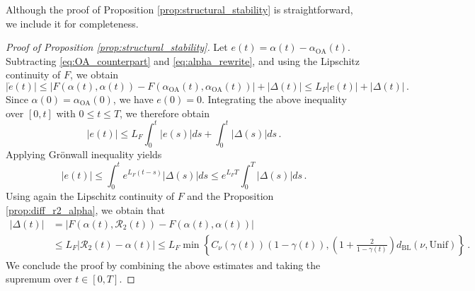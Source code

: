 \documentclass[10pt]{article}
\theoremstyle{definition}
\theoremstyle{definition}
\newtheorem{remark}[theorem]{Remark}
\numberwithin{equation}{section}
\newcommand{\CR}{\mathcal{R}}
\newcommand{\BL}{\mathrm{BL}}
\newcommand{\Unif}{\mathrm{Unif}}
\newcommand{\OA}{\mathrm{OA}}
\begin{document}
Although the proof of Proposition \ref{prop:structural_stability} is straightforward, we include it for completeness.

\begin{proof}[Proof of Proposition \ref{prop:structural_stability}]
Let $e(t) = \alpha(t) - \alpha_{\OA}(t)$.
Subtracting \eqref{eq:OA_counterpart} and \eqref{eq:alpha_rewrite}, and using the Lipschitz continuity of $F$, we obtain
\begin{equation*}
|\dot{e}(t)| \leq \left| F(\alpha(t), \alpha(t)) - F(\alpha_{\OA}(t), \alpha_{\OA}(t)) \right| + |\Delta(t)| \leq L_F|e(t)| + |\Delta(t)| \, .
\end{equation*}
Since $\alpha(0) = \alpha_{\OA}(0)$, we have $e(0) = 0$.
Integrating the above inequality over $[0,t]$ with $0 \leq t \leq T$, we therefore obtain
\begin{equation*}
|e(t)| \leq L_F \int_0^t |e(s)|ds + \int_0^t |\Delta(s)| ds \, .
\end{equation*}
Applying Grönwall inequality yields
\begin{equation*}
|e(t)| \leq \int_0^t e^{L_F(t-s)} |\Delta(s)| ds \leq e^{L_F T} \int_0^T |\Delta(s)| ds \, .
\end{equation*}
Using again the Lipschitz continuity of $F$ and the Proposition \ref{prop:diff_r2_alpha}, we obtain that
\begin{equation*}
\begin{aligned}
|\Delta(t)| &= \left| F(\alpha(t), \CR_2(t)) - F(\alpha(t), \alpha(t)) \right| \\
&\leq L_F |\CR_2(t) - \alpha(t)| \leq L_F \min \left\{ C_{\nu} (\gamma(t)) (1 - \gamma(t)),  \left( 1 + \frac{2}{1 - \gamma(t)} \right) d_{\BL} (\nu, \Unif) \right\} \, .
\end{aligned}
\end{equation*}
We conclude the proof by combining the above estimates and taking the supremum over $t \in [0,T]$.
\end{proof}

\end{document}
